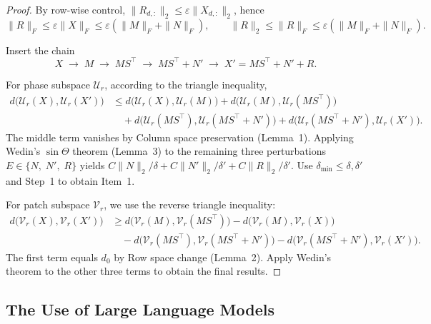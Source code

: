 \begin{proof}
By row-wise control,
$\|R_{d,:}\|_2\le \varepsilon\|X_{d,:}\|_2$, hence
\[
\|R\|_F\le \varepsilon\|X\|_F\le \varepsilon(\|M\|_F+\|N\|_F),
\qquad
\|R\|_2\le \|R\|_F\le \varepsilon(\|M\|_F+\|N\|_F).
\]

Insert the chain
\[
X \;\to\; M \;\to\; MS^\top \;\to\; MS^\top+N' \;\to\; X'=MS^\top+N'+R.
\]

For phase subspace $\mathcal U_r$, according to the triangle inequality,
\[
\begin{aligned}
d\big(\mathcal U_r(X),\mathcal U_r(X')\big)
&\le d\big(\mathcal U_r(X),\mathcal U_r(M)\big)
+ d\big(\mathcal U_r(M),\mathcal U_r(MS^\top)\big)\\
&\quad + d\big(\mathcal U_r(MS^\top),\mathcal U_r(MS^\top+N')\big)
+ d\big(\mathcal U_r(MS^\top+N'),\mathcal U_r(X')\big).
\end{aligned}
\]
The middle term vanishes by Column space preservation (Lemma~1).
Applying Wedin’s $\sin\Theta$ theorem (Lemma~3) to the remaining three perturbations $E\in\{N,\;N',\;R\}$
yields
$C\|N\|_2/\delta + C\|N'\|_2/\delta' + C\|R\|_2/\delta'$.
Use $\delta_{\min}\le\delta,\delta'$ and Step~1 to obtain Item~1.

For patch subspace $\mathcal V_r$, we use the reverse triangle inequality:
\[
\begin{aligned}
d\big(\mathcal V_r(X),\mathcal V_r(X')\big)
&\ge d\big(\mathcal V_r(M),\mathcal V_r(MS^\top)\big)
- d\big(\mathcal V_r(M),\mathcal V_r(X)\big)\\
&\quad - d\big(\mathcal V_r(MS^\top),\mathcal V_r(MS^\top+N')\big)
- d\big(\mathcal V_r(MS^\top+N'),\mathcal V_r(X')\big).
\end{aligned}
\]
The first term equals $d_0$ by Row space change (Lemma~2).
Apply Wedin’s theorem to the other three terms to obtain the final results.
\end{proof}


\subsection{The Use of Large Language Models}

